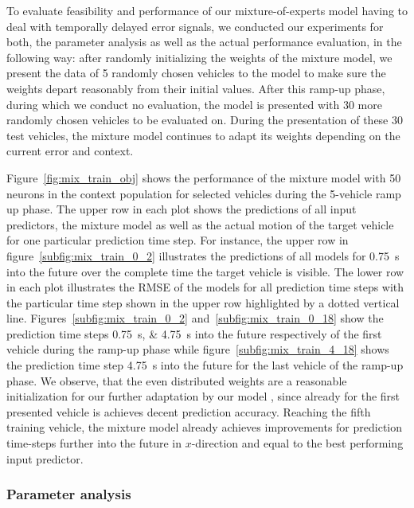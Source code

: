 To evaluate feasibility and performance of our mixture-of-experts model having to deal with temporally delayed error signals, we conducted our experiments for both, the parameter analysis as well as the actual performance evaluation, in the following way:
after randomly initializing the weights of the mixture model, we present the data of \num{5} randomly chosen vehicles to the model to make sure the weights depart reasonably from their initial values.
After this ramp-up phase, during which we conduct no evaluation, the model is presented with \num{30} more randomly chosen vehicles to be evaluated on.
During the presentation of these \num{30} test vehicles, the mixture model continues to adapt its weights depending on the current error and context.

Figure~\ref{fig:mix_train_obj} shows the performance of the mixture model with \num{50} neurons in the context population for selected vehicles during the \num{5}-vehicle ramp up phase.
The upper row in each plot shows the predictions of all input predictors, the mixture model as well as the actual motion of the target vehicle for one particular prediction time step.
For instance, the upper row in figure~\ref{subfig:mix_train_0_2} illustrates the predictions of all models for \SI{0.75}{\second} into the future over the complete time the target vehicle is visible.
The lower row in each plot illustrates the \ac{RMSE} of the models for all prediction time steps with the particular time step shown in the upper row highlighted by a dotted vertical line.
Figures~\ref{subfig:mix_train_0_2} and~\ref{subfig:mix_train_0_18} show the prediction time steps \SIlist{0.75;4.75}{\second} into the future respectively of the first vehicle during the ramp-up phase while figure~\ref{subfig:mix_train_4_18} shows the prediction time step \SI{4.75}{\second} into the future for the last vehicle of the ramp-up phase.
We observe, that the even distributed weights are a reasonable initialization for our further adaptation by our model , since already for the first presented vehicle is achieves decent prediction accuracy.
Reaching the fifth training vehicle, the mixture model already achieves improvements for prediction time-steps further into the future in $x$-direction and equal to the best performing input predictor.

\subsubsection{Parameter analysis}%
\label{ssubsec:parameter_analysis}

